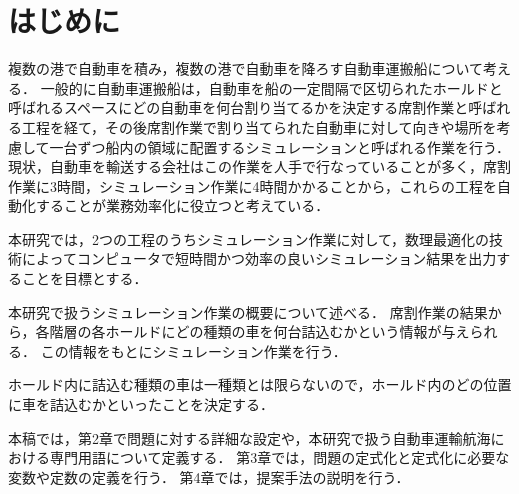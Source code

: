 \chapter{はじめに}

複数の港で自動車を積み，複数の港で自動車を降ろす自動車運搬船について考える．
一般的に自動車運搬船は，自動車を船の一定間隔で区切られたホールドと呼ばれるスペースにどの自動車を何台割り当てるかを決定する席割作業と呼ばれる工程を経て，その後席割作業で割り当てられた自動車に対して向きや場所を考慮して一台ずつ船内の領域に配置するシミュレーションと呼ばれる作業を行う．
現状，自動車を輸送する会社はこの作業を人手で行なっていることが多く，席割作業に3時間，シミュレーション作業に4時間かかることから，これらの工程を自動化することが業務効率化に役立つと考えている．

本研究では，2つの工程のうちシミュレーション作業に対して，数理最適化の技術によってコンピュータで短時間かつ効率の良いシミュレーション結果を出力することを目標とする．

本研究で扱うシミュレーション作業の概要について述べる．
席割作業の結果から，各階層の各ホールドにどの種類の車を何台詰込むかという情報が与えられる．
この情報をもとにシミュレーション作業を行う．

ホールド内に詰込む種類の車は一種類とは限らないので，ホールド内のどの位置に車を詰込むかといったことを決定する．


本稿では，第2章で問題に対する詳細な設定や，本研究で扱う自動車運輸航海における専門用語について定義する．
第3章では，問題の定式化と定式化に必要な変数や定数の定義を行う．
第4章では，提案手法の説明を行う．
